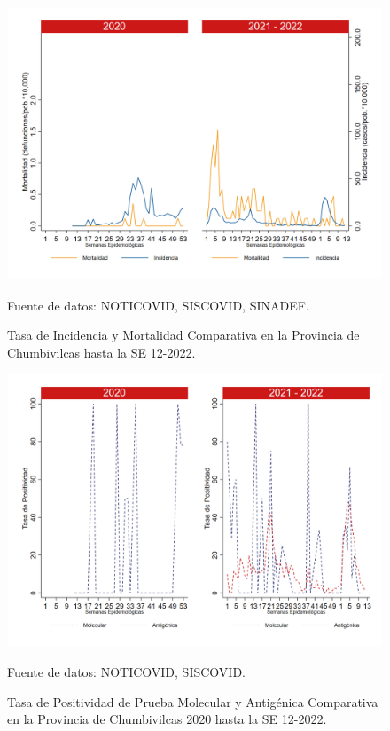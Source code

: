 \documentclass[12pt,a4paper,openany]{book}
\begin{document}
		\begin{figure}[h]
			\caption{Tasa de Incidencia y Mortalidad Comparativa en la Provincia de Chumbivilcas hasta la SE 12-2022.}\label{fig:inc_mort_chumbivilcas}
			\begin{center}
				\includegraphics[width=0.85\linewidth]{../figuras/incidencia_mortalidad_20_21_6.png}
			\end{center}
			{\footnotesize {Fuente de datos: NOTICOVID, SISCOVID, SINADEF.}}
		\end{figure}
		
		\begin{figure}[h]
			\caption{Tasa de Positividad de Prueba Molecular y Antigénica Comparativa en la Provincia de Chumbivilcas 2020 hasta la SE 12-2022.}\label{fig:positividad_chumbivilcas}
			\begin{center}
				\includegraphics[width=0.7\linewidth]{../figuras/positividad_20_21_6.png}
			\end{center}
			{\footnotesize {Fuente de datos: NOTICOVID, SISCOVID.}}
		\end{figure}
		
\end{document}
